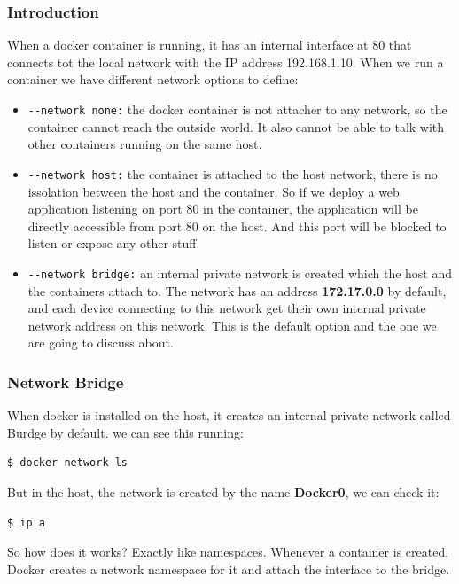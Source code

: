 \documentclass{article}
\newenvironment{codetemplate}[1][]{%
  \mybasecolorbox[#1]
  \itshape
}{%
  \endmybasecolorbox
}
\begin{document}
\subsubsection{Introduction}
When a docker container is running, it has an internal interface at 80 that connects tot the local network with the IP address 192.168.1.10. When we run a container we have different network options to define:
\begin{itemize}
    \item \verb|--network none:| the docker container is not attacher to any network, so the container cannot reach the outside world. It also cannot be able to talk with other containers running on the same host.
    \item \verb|--network host:| the container is attached to the host network, there is no issolation between the host and the container. So if we deploy a web application listening on port 80 in the container, the application will be directly accessible from port 80 on the host. And this port will be blocked to listen or expose any other stuff.
    \item \verb|--network bridge:| an internal private network is created which the host and the containers attach to. The network has an address \textbf{172.17.0.0} by default, and each device connecting to this network get their own internal private network address on this network. This is the default option and the one we are going to discuss about.
\end{itemize}

\subsubsection{Network Bridge}
When docker is installed on the host, it creates an internal private network called Burdge by default. we can see this running:
\begin{codetemplate}{}
\begin{verbatim}
$ docker network ls
\end{verbatim}
\end{codetemplate}

But in the host, the network is created by the name \textbf{Docker0}, we can check it:
\begin{codetemplate}{}
\begin{verbatim}
$ ip a
\end{verbatim}
\end{codetemplate}

So how does it works? Exactly like namespaces. Whenever a container is created, Docker creates a network namespace for it and attach the interface to the bridge. 
\end{document}
